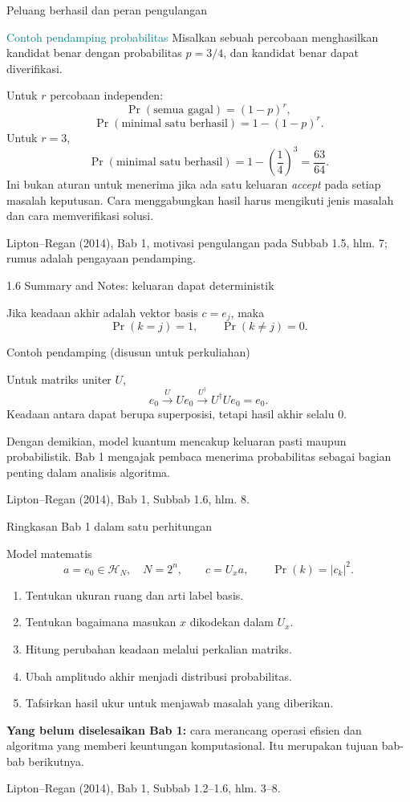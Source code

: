 \documentclass[aspectratio=169,11pt]{beamer}
\newcommand{\bookref}[1]{\par\vfill{\scriptsize\color{gray}Lipton--Regan (2014), Bab 1, #1.}}
\newcommand{\extra}{\par\textcolor{AcademicBlue}{\small Contoh pendamping (disusun untuk perkuliahan)}\par}
\begin{document}
\begin{frame}{Peluang berhasil dan peran pengulangan}

\textcolor{teal}{\small Contoh pendamping probabilitas}
Misalkan sebuah percobaan menghasilkan kandidat benar dengan probabilitas $p=3/4$, dan kandidat benar dapat diverifikasi.
\par\medskip
Untuk $r$ percobaan independen:
\[
 \Pr(\text{semua gagal})=(1-p)^r,
\]
\[
 \Pr(\text{minimal satu berhasil})=1-(1-p)^r.
\]
Untuk $r=3$,
\[
 \Pr(\text{minimal satu berhasil})=1-\left(\frac14\right)^3=\frac{63}{64}.
\]
\small
Ini bukan aturan untuk menerima jika ada satu keluaran \textit{accept} pada setiap masalah keputusan. Cara menggabungkan hasil harus mengikuti jenis masalah dan cara memverifikasi solusi.
\bookref{motivasi pengulangan pada Subbab 1.5, hlm. 7; rumus adalah pengayaan pendamping}

\end{frame}

\begin{frame}{1.6 Summary and Notes: keluaran dapat deterministik}

Jika keadaan akhir adalah vektor basis $c=e_j$, maka
\[
 \Pr(k=j)=1,\qquad \Pr(k\neq j)=0.
\]
\extra
Untuk matriks uniter $U$,
\[
 e_0\xrightarrow{U}Ue_0\xrightarrow{U^\dagger}U^\dagger Ue_0=e_0.
\]
Keadaan antara dapat berupa superposisi, tetapi hasil akhir selalu 0.
\par\medskip
Dengan demikian, model kuantum mencakup keluaran pasti maupun probabilistik. Bab 1 mengajak pembaca menerima probabilitas sebagai bagian penting dalam analisis algoritma.
\bookref{Subbab 1.6, hlm. 8}

\end{frame}

\begin{frame}{Ringkasan Bab 1 dalam satu perhitungan}

\begin{block}{Model matematis}
\[
 a=e_0\in\mathcal H_N,\quad N=2^n,\qquad
 c=U_xa,\qquad \Pr(k)=|c_k|^2.
\]
\end{block}
\begin{enumerate}
\item Tentukan ukuran ruang dan arti label basis.
\item Tentukan bagaimana masukan $x$ dikodekan dalam $U_x$.
\item Hitung perubahan keadaan melalui perkalian matriks.
\item Ubah amplitudo akhir menjadi distribusi probabilitas.
\item Tafsirkan hasil ukur untuk menjawab masalah yang diberikan.
\end{enumerate}
\textbf{Yang belum diselesaikan Bab 1:} cara merancang operasi efisien dan algoritma yang memberi keuntungan komputasional. Itu merupakan tujuan bab-bab berikutnya.
\bookref{Subbab 1.2--1.6, hlm. 3--8}

\end{frame}
\end{document}
